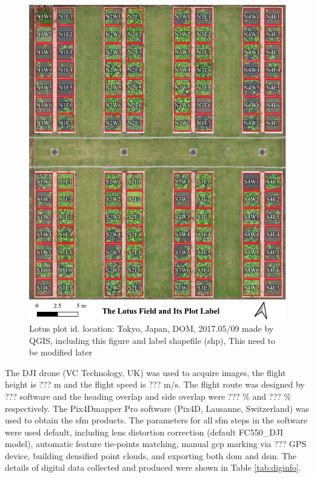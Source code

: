 \documentclass[sensors,article,submit,moreauthors, xelatex]{Definitions/mdpi}
\begin{document}
\begin{figure}[H]
  \centering
  \includegraphics[width=0.95\linewidth]{figures/plot_with_id.pdf}
  \caption{Lotus plot id. location: Tokyo, Japan, DOM, 2017.05/09 made by QGIS, including this figure and label shapefile (shp), This need to be modified later}
  \label{fig:plotid}
\end{figure}

The DJI drone (VC Technology, UK) was used to acquire images, the flight height is ??? m and the flight speed is ??? m/s. The flight route was designed by ??? software and the heading overlap and side overlap were ??? \% and ??? \% respectively. The Pix4Dmapper Pro software (Pix4D, Lausanne, Switzerland) was used to obtain the \acrshort*{sfm} products. The parameters for all \acrshort*{sfm} steps in the software were used default, including lens distortion correction (default FC550_DJI model), automatic feature tie-points matching, manual \acrfull*{gcp} marking via ??? GPS device, building densified point clouds, and exporting both \acrshort*{dom} and \acrshort*{dsm}. The details of digital data collected and produced were shown in Table \ref{tab:diginfo}.
\end{document}
